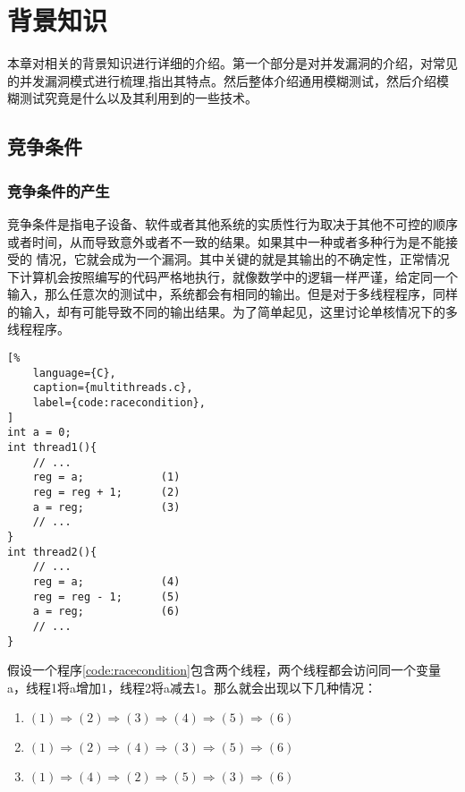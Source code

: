 \clearpage{}

\section{背景知识}

本章对相关的背景知识进行详细的介绍。第一个部分是对并发漏洞的介绍，对常见的并发漏洞模式进行梳理,指出其特点。然后整体介绍通用模糊测试，然后介绍模糊测试究竟是什么以及其利用到的一些技术。

\subsection{竞争条件}

\subsubsection{竞争条件的产生}

竞争条件是指电子设备、软件或者其他系统的实质性行为取决于其他不可控的顺序或者时间，从而导致意外或者不一致的结果。如果其中一种或者多种行为是不能接受的 情况，它就会成为一个漏洞。其中关键的就是其输出的不确定性，正常情况下计算机会按照编写的代码严格地执行，就像数学中的逻辑一样严谨，给定同一个输入，那么任意次的测试中，系统都会有相同的输出。但是对于多线程程序，同样的输入，却有可能导致不同的输出结果。为了简单起见，这里讨论单核情况下的多线程程序。

\begin{spacing}{1.0}
\begin{lstlisting}[%
    language={C},
    caption={multithreads.c},
    label={code:racecondition},
]
int a = 0;
int thread1(){
    // ...
    reg = a;            (1)
    reg = reg + 1;      (2)
    a = reg;            (3)
    // ...
}
int thread2(){
    // ...
    reg = a;            (4)
    reg = reg - 1;      (5)
    a = reg;            (6)
    // ...
}
\end{lstlisting}
\end{spacing}

假设一个程序\autoref{code:racecondition}包含两个线程，两个线程都会访问同一个变量a，线程1将a增加1，线程2将a减去1。那么就会出现以下几种情况：

\begin{enumerate}
\item $(1) \Rightarrow (2) \Rightarrow (3) \Rightarrow (4) \Rightarrow (5) \Rightarrow (6)$
\item $(1) \Rightarrow (2) \Rightarrow (4) \Rightarrow (3) \Rightarrow (5) \Rightarrow (6)$
\item $(1) \Rightarrow (4) \Rightarrow (2) \Rightarrow (5) \Rightarrow (3) \Rightarrow (6)$
\end{enumerate}


